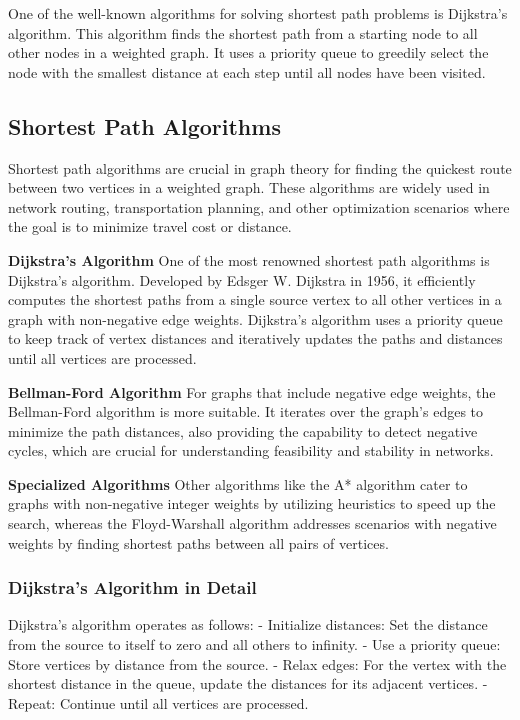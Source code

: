 \documentclass[12pt]{book} %
\begin{document}
One of the well-known algorithms for solving shortest path problems is Dijkstra's algorithm. This algorithm finds the shortest path from a starting node to all other nodes in a weighted graph. It uses a priority queue to greedily select the node with the smallest distance at each step until all nodes have been visited.

\subsection{Shortest Path Algorithms}
Shortest path algorithms are crucial in graph theory for finding the quickest route between two vertices in a weighted graph. These algorithms are widely used in network routing, transportation planning, and other optimization scenarios where the goal is to minimize travel cost or distance.

\textbf{Dijkstra's Algorithm}
One of the most renowned shortest path algorithms is Dijkstra's algorithm. Developed by Edsger W. Dijkstra in 1956, it efficiently computes the shortest paths from a single source vertex to all other vertices in a graph with non-negative edge weights. Dijkstra's algorithm uses a priority queue to keep track of vertex distances and iteratively updates the paths and distances until all vertices are processed.

\textbf{Bellman-Ford Algorithm}
For graphs that include negative edge weights, the Bellman-Ford algorithm is more suitable. It iterates over the graph's edges to minimize the path distances, also providing the capability to detect negative cycles, which are crucial for understanding feasibility and stability in networks.

\textbf{Specialized Algorithms}
Other algorithms like the A* algorithm cater to graphs with non-negative integer weights by utilizing heuristics to speed up the search, whereas the Floyd-Warshall algorithm addresses scenarios with negative weights by finding shortest paths between all pairs of vertices.

\subsubsection{Dijkstra's Algorithm in Detail}
Dijkstra's algorithm operates as follows:
- Initialize distances: Set the distance from the source to itself to zero and all others to infinity.
- Use a priority queue: Store vertices by distance from the source.
- Relax edges: For the vertex with the shortest distance in the queue, update the distances for its adjacent vertices.
- Repeat: Continue until all vertices are processed.
\end{document}
